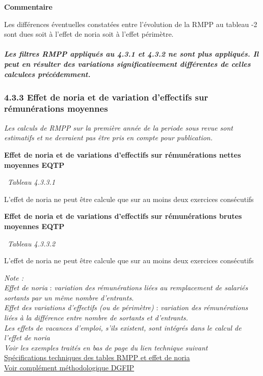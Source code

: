 \textbf{Commentaire}

Les différences éventuelles constatées entre l'évolution de la RMPP au
tableau -2 sont dues soit à l'effet de noria soit à l'effet périmètre.

\hypertarget{les-filtres-rmpp-appliques-au-4.3.1-et-4.3.2-ne-sont-plus-appliques.-il-peut-en-resulter-des-variations-significativement-differentes-de-celles-calculees-precedemment.}{%
\subparagraph{Les filtres RMPP appliqués au 4.3.1 et 4.3.2 ne sont plus
appliqués. Il peut en résulter des variations significativement
différentes de celles calculees
précédemment.}\label{les-filtres-rmpp-appliques-au-4.3.1-et-4.3.2-ne-sont-plus-appliques.-il-peut-en-resulter-des-variations-significativement-differentes-de-celles-calculees-precedemment.}}

\hypertarget{effet-de-noria-et-de-variation-deffectifs-sur-remunerations-moyennes}{%
\subsubsection{4.3.3 Effet de noria et de variation d'effectifs sur
rémunérations
moyennes}\label{effet-de-noria-et-de-variation-deffectifs-sur-remunerations-moyennes}}

\emph{Les calculs de RMPP sur la première année de la periode sous revue
sont estimatifs et ne devraient pas être pris en compte pour
publication.}

\textbf{Effet de noria et de variations d'effectifs sur rémunérations
nettes moyennes EQTP}

~\emph{Tableau 4.3.3.1}

L'effet de noria ne peut être calcule que sur au moins deux exercices
consécutifs

\textbf{Effet de noria et de variations d'effectifs sur rémunérations
brutes moyennes EQTP}

~\emph{Tableau 4.3.3.2}

L'effet de noria ne peut être calcule que sur au moins deux exercices
consécutifs

\emph{Note :}\\
\emph{Effet de noria} : \emph{variation des rémunérations liées au
remplacement de salariés sortants par un même nombre d'entrants.}\\
\emph{Effet des variations d'effectifs (ou de périmètre)} :
\emph{variation des rémunérations liées à la différence entre nombre de
sortants et d'entrants.}\\
\emph{Les effets de vacances d'emploi, s'ils existent, sont intégrés
dans le calcul de l'effet de noria}\\
\emph{Voir les exemples traités en bas de page du lien technique
suivant}\\
\href{../Docs/Notices/noria.html}{Spécifications techniques des tables RMPP
et effet de noria}\\
\href{../Docs/Notices/GVT\%20et\%20noria.pdf}{Voir complément
méthodologique DGFIP}


